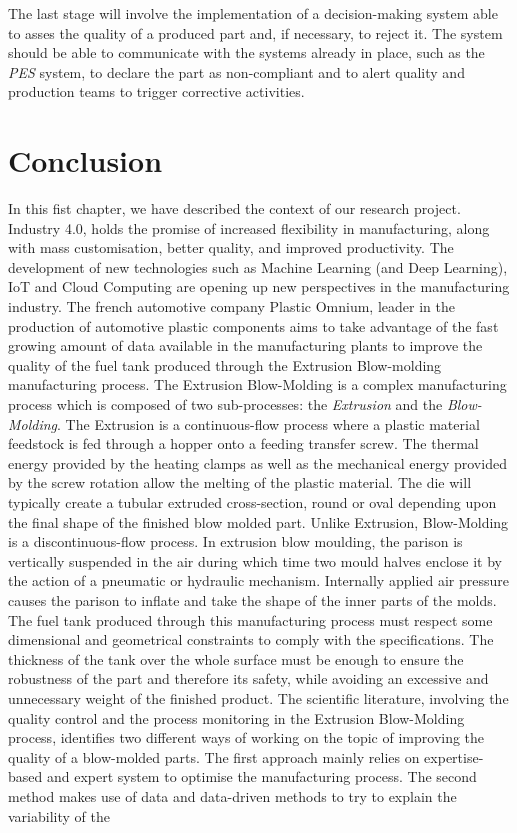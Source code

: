 The last stage will involve the implementation of a decision-making system able to asses the quality of a produced part and, if necessary, to reject it. The system should be able to communicate with the systems already in place, such as the \textit{PES} system, to declare the part as non-compliant and to alert quality and production teams to trigger corrective activities. 


\section{Conclusion}

In this fist chapter, we have described the context of our research project. Industry 4.0, holds the promise of increased flexibility in manufacturing, along with mass customisation, better quality, and improved productivity. The development of new technologies such as Machine Learning (and Deep Learning), IoT and Cloud Computing are opening up new perspectives in the manufacturing industry. The french automotive company Plastic Omnium, leader in the production of automotive plastic components aims to take advantage of the fast growing amount of data available in the manufacturing plants to improve the quality of the fuel tank produced through the Extrusion Blow-molding manufacturing process. The Extrusion Blow-Molding is a complex manufacturing process which is composed of two sub-processes: the \textit{Extrusion} and the \textit{Blow-Molding}. The Extrusion is a continuous-flow process where a plastic material feedstock is fed through a hopper onto a feeding transfer screw. The thermal energy provided by the heating clamps as well as the mechanical energy provided by the screw rotation allow the melting of the plastic material. The die will typically create a tubular extruded cross-section, round or oval depending upon the final shape of the finished blow molded part. Unlike Extrusion, Blow-Molding is a discontinuous-flow process. In extrusion blow moulding, the parison is vertically suspended in the air during which time two mould halves enclose it by the action of a pneumatic or hydraulic mechanism. Internally applied air pressure causes the parison to inflate and take the shape of the inner parts of the molds. The fuel tank produced through this manufacturing process must respect some dimensional and geometrical constraints to comply with the specifications. The thickness of the tank over the whole surface must be enough to ensure the robustness of the part and therefore its safety, while avoiding an excessive and unnecessary weight of the finished product. The scientific literature, involving the quality control and the process monitoring in the Extrusion Blow-Molding process, identifies two different ways of working on the topic of improving the quality of a blow-molded parts. The first approach mainly relies on expertise-based and expert system to optimise the manufacturing process. The second method makes use of data and data-driven methods to try to explain the variability of the 